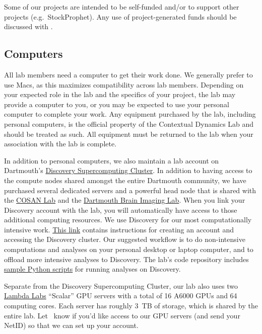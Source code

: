 \documentclass{tufte-book} %
\begin{document}
 Some of our projects are intended to be self-funded and/or to support
 other projects (e.g.\ StockProphet).  Any use of project-generated
 funds should be discussed with \director.

 \subsection{Computers}

 All lab members need a computer to get their work done.  We generally
 prefer to use Macs, as this maximizes compatibility across lab
 members.  Depending on your expected role in the lab and the
 specifics of your project, the lab may provide a computer to you, or
 you may be expected to use your personal computer to complete your
 work.  Any equipment purchased by the lab, including personal
 computers, is the official property of the Contextual Dynamics Lab
 and should be treated as such.  All equipment must be returned to the
 lab when your association with the lab is complete.

 In addition to personal computers, we also maintain a lab account on
 Dartmouth's \href{http://techdoc.dartmouth.edu/discovery/}{Discovery
   Supercomputing Cluster}.  In addition to having access to the
 compute nodes shared amongst the entire Dartmouth community, we have
 purchased several dedicated servers and a powerful head node that is
 shared with the \href{http://www.cosanlab.com/}{COSAN Lab} and the
 \href{http://www.dartmouth.edu/~bil/}{Dartmouth Brain Imaging Lab}.
 When you link your Discovery account with the lab, you will
 automatically have access to those additional computing resources.
 We use Discovery for our most computationally intensive work.
 \href{https://rc.dartmouth.edu/index.php/discovery-overview/accessing-the-cluster}{This
   link} contains instructions for creating an account and
 accessing the Discovery cluster.  Our suggested workflow is to do non-intensive
 computations and analyses on your personal desktop or laptop
 computer, and to offload more intensive analyses to Discovery.  The
 lab's code repository includes
 \href{https://github.com/ContextLab/cluster-tools-dartmouth}{sample
   Python scripts} for running analyses on Discovery.

 Separate from the Discovery Supercomputing Cluster, our lab also uses two
 \href{https://lambdalabs.com/}{Lambda Labs} ``Scalar'' GPU servers with a
 total of 16 A6000 GPUs and 64 computing cores. Each server has roughly 3~TB of
 storage, which is shared by the entire lab. Let \director~know if you'd like
 access to our GPU servers (and send your NetID) so that we can set up your
 account.
\end{document}
